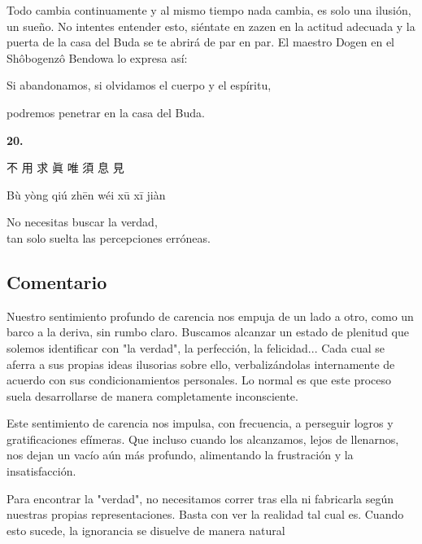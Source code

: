 \documentclass[
  a5paperpaper,
]{article}
\begin{document}
Todo cambia continuamente y al mismo tiempo nada cambia, es solo una
ilusión, un sueño. No intentes entender esto, siéntate en zazen en la
actitud adecuada y la puerta de la casa del Buda se te abrirá de par en
par. El maestro Dogen en el Shôbogenzô Bendowa lo expresa así:

Si abandonamos, si olvidamos el cuerpo y el espíritu,

podremos penetrar en la casa del Buda.

\hfill\break

\hypertarget{05}{}
\begin{verseblock}

\newpage

\begin{center}\textbf{20.}\end{center}

不 用 求 眞 唯 須 息 見

Bù yòng qiú zhēn wéi xū xī jiàn

No necesitas buscar la verdad,\\
tan solo suelta las percepciones erróneas.

\end{verseblock}

\hfill\break

\hypertarget{comentario-19}{%
\subsection{Comentario}\label{comentario-19}}

Nuestro sentimiento profundo de carencia nos empuja de un lado a otro,
como un barco a la deriva, sin rumbo claro. Buscamos alcanzar un estado
de plenitud que solemos identificar con "la verdad", la perfección, la
felicidad... Cada cual se aferra a sus propias ideas ilusorias sobre
ello, verbalizándolas internamente de acuerdo con sus condicionamientos
personales. Lo normal es que este proceso suela desarrollarse de manera
completamente inconsciente.

Este sentimiento de carencia nos impulsa, con frecuencia, a perseguir
logros y gratificaciones efímeras. Que incluso cuando los alcanzamos,
lejos de llenarnos, nos dejan un vacío aún más profundo, alimentando la
frustración y la insatisfacción.

Para encontrar la "verdad", no necesitamos correr tras ella ni
fabricarla según nuestras propias representaciones. Basta con ver la
realidad tal cual es. Cuando esto sucede, la ignorancia se disuelve de
manera natural
\end{document}
